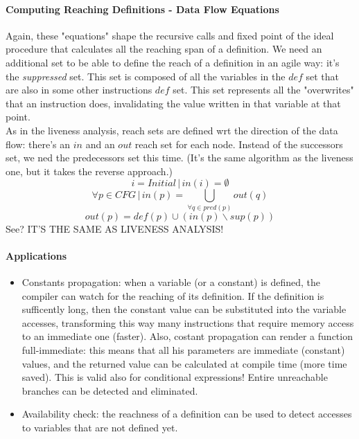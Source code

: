                     \paragraph{Computing Reaching Definitions - Data Flow Equations}
                        Again, these "equations" shape the recursive calls and fixed point of the ideal procedure that calculates all the reaching span of a definition. We need an additional set to be able to define the reach of a definition in an agile way: it's the \emph{suppressed} set. This set is composed of all the variables in the $def$ set that are also in some other instructions $def$ set. This set represents all the "overwrites" that an instruction does, invalidating the value written in that variable at that point.\\
                        As in the liveness analysis, reach sets are defined wrt the direction of the data flow: there's an $in$ and an $out$ reach set for each node. Instead of the successors set, we ned the predecessors set this time. (It's the same algorithm as the liveness one, but it takes the reverse approach.)
                        \begin{equation}
                            i = Initial \,\vert\, in(i) = \emptyset
                        \end{equation}
                        \begin{equation}
                            \forall p \in CFG \,\vert\, in(p) = \bigcup\limits_{\forall q \in pred(p)} out(q)
                        \end{equation}
                        \begin{equation}
                            out(p) = def(p) \cup (in(p) \backslash sup(p))
                        \end{equation}
                        See? IT'S THE SAME AS LIVENESS ANALYSIS!
                    
                    \paragraph{Applications}
                        \begin{itemize}
                            \item Constants propagation: when a variable (or a constant) is defined, the compiler can watch for the reaching of its definition. If the definition is sufficently long, then the constant value can be substituted into the variable accesses, transforming this way many instructions that require memory access to an immediate one (faster). Also, costant propagation can render a function full-immediate: this means that all his parameters are immediate (constant) values, and the returned value can be calculated at compile time (more time saved). This is valid also for conditional expressions! Entire unreachable branches can be detected and eliminated.
                            \item Availability check: the reachness of a definition can be used to detect accesses to variables that are not defined yet. 
                        \end{itemize}